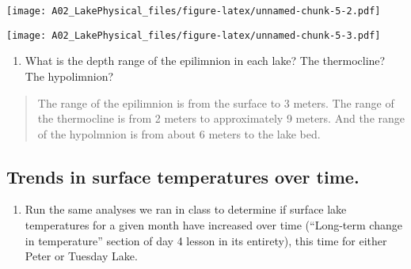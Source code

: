 \documentclass[]{article}
\newenvironment{Shaded}{\begin{snugshade}}{\end{snugshade}}
\newcommand{\DataTypeTok}[1]{\textcolor[rgb]{0.13,0.29,0.53}{#1}}
\newcommand{\FloatTok}[1]{\textcolor[rgb]{0.00,0.00,0.81}{#1}}
\newcommand{\KeywordTok}[1]{\textcolor[rgb]{0.13,0.29,0.53}{\textbf{#1}}}
\newcommand{\NormalTok}[1]{#1}
\newcommand{\OperatorTok}[1]{\textcolor[rgb]{0.81,0.36,0.00}{\textbf{#1}}}
\newcommand{\StringTok}[1]{\textcolor[rgb]{0.31,0.60,0.02}{#1}}
\providecommand{\tightlist}{%
  \setlength{\itemsep}{0pt}\setlength{\parskip}{0pt}}
\begin{document}
\texttt{[image: A02\_LakePhysical\_files/figure-latex/unnamed-chunk-5-2.pdf]}

\begin{Shaded}
\end{Shaded}

\texttt{[image: A02\_LakePhysical\_files/figure-latex/unnamed-chunk-5-3.pdf]}

\begin{enumerate}
\def\labelenumi{\arabic{enumi}.}
\setcounter{enumi}{9}
\tightlist
\item
  What is the depth range of the epilimnion in each lake? The
  thermocline? The hypolimnion?
\end{enumerate}

\begin{quote}
The range of the epilimnion is from the surface to 3 meters. The range
of the thermocline is from 2 meters to approximately 9 meters. And the
range of the hypolmnion is from about 6 meters to the lake bed.
\end{quote}

\hypertarget{trends-in-surface-temperatures-over-time.}{%
\subsection{Trends in surface temperatures over
time.}\label{trends-in-surface-temperatures-over-time.}}

\begin{enumerate}
\def\labelenumi{\arabic{enumi}.}
\setcounter{enumi}{10}
\tightlist
\item
  Run the same analyses we ran in class to determine if surface lake
  temperatures for a given month have increased over time (``Long-term
  change in temperature'' section of day 4 lesson in its entirety), this
  time for either Peter or Tuesday Lake.
\end{enumerate}
\end{document}

